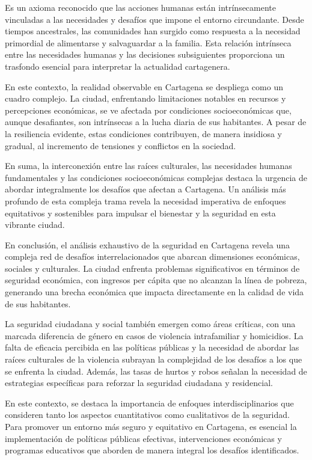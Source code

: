\documentclass[letterpaper, 12pt]{article}
\begin{document}
Es un axioma reconocido que las acciones humanas están
intrínsecamente vinculadas a las necesidades y desafíos que
impone el entorno circundante. Desde tiempos ancestrales,
las comunidades han surgido como respuesta a la necesidad
primordial de alimentarse y salvaguardar a la familia. Esta
relación intrínseca entre las necesidades humanas y las
decisiones subsiguientes proporciona un trasfondo esencial
para interpretar la actualidad cartagenera.

En este contexto, la realidad observable en Cartagena se
despliega como un cuadro complejo. La ciudad, enfrentando
limitaciones notables en recursos y percepciones
económicas, se ve afectada por condiciones socioeconómicas
que, aunque desafiantes, son intrínsecas a la lucha diaria
de sus habitantes. A pesar de la resiliencia evidente,
estas condiciones contribuyen, de manera insidiosa y
gradual, al incremento de tensiones y conflictos en la
sociedad.

En suma, la interconexión entre las raíces culturales, las
necesidades humanas fundamentales y las condiciones
socioeconómicas complejas destaca la urgencia de abordar
integralmente los desafíos que afectan a Cartagena. Un
análisis más profundo de esta compleja trama revela la
necesidad imperativa de enfoques equitativos y sostenibles
para impulsar el bienestar y la seguridad en esta vibrante
ciudad.


En conclusión, el análisis exhaustivo de la seguridad en
Cartagena revela una compleja red de desafíos
interrelacionados que abarcan dimensiones económicas,
sociales y culturales. La ciudad enfrenta problemas
significativos en términos de seguridad económica, con
ingresos per cápita que no alcanzan la línea de pobreza,
generando una brecha económica que impacta directamente en
la calidad de vida de sus habitantes.

La seguridad ciudadana y social también emergen como áreas
críticas, con una marcada diferencia de género en casos de
violencia intrafamiliar y homicidios. La falta de eficacia
percibida en las políticas públicas y la necesidad de
abordar las raíces culturales de la violencia subrayan la
complejidad de los desafíos a los que se enfrenta la
ciudad. Además, las tasas de hurtos y robos señalan la
necesidad de estrategias específicas para reforzar la
seguridad ciudadana y residencial.

En este contexto, se destaca la importancia de enfoques
interdisciplinarios que consideren tanto los aspectos
cuantitativos como cualitativos de la seguridad. Para
promover un entorno más seguro y equitativo en Cartagena,
es esencial la implementación de políticas públicas
efectivas, intervenciones económicas y programas educativos
que aborden de manera integral los desafíos identificados.

\printbibliography
\end{document}
